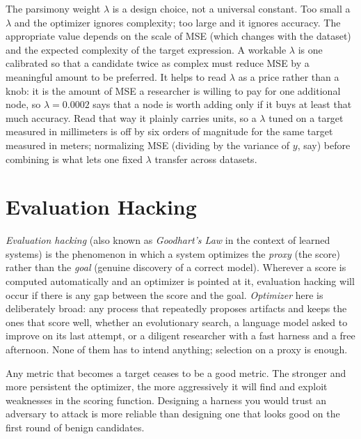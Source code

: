 \begin{remark}
The parsimony weight $\lambda$ is a design choice, not a universal constant.
Too small a $\lambda$ and the optimizer ignores complexity; too large and it ignores accuracy.
The appropriate value depends on the scale of MSE (which changes with the dataset) and the expected complexity of the target expression.
A workable $\lambda$ is one calibrated so that a candidate twice as complex must reduce MSE by a meaningful amount to be preferred.
It helps to read $\lambda$ as a price rather than a knob: it is the amount of MSE a researcher is willing to pay for one additional node, so $\lambda = 0.0002$ says that a node is worth adding only if it buys at least that much accuracy.
Read that way it plainly carries units, so a $\lambda$ tuned on a target measured in millimeters is off by six orders of magnitude for the same target measured in meters; normalizing MSE (dividing by the variance of $y$, say) before combining is what lets one fixed $\lambda$ transfer across datasets.
\end{remark}

\section{Evaluation Hacking}
\label{section:EvalHacking}

\emph{Evaluation hacking} (also known as \emph{Goodhart's Law} in the context of learned systems) is the phenomenon in which a system optimizes the \emph{proxy} (the score) rather than the \emph{goal} (genuine discovery of a correct model).
Wherever a score is computed automatically and an optimizer is pointed at it, evaluation hacking will occur if there is any gap between the score and the goal.
\emph{Optimizer} here is deliberately broad: any process that repeatedly proposes artifacts and keeps the ones that score well, whether an evolutionary search, a language model asked to improve on its last attempt, or a diligent researcher with a fast harness and a free afternoon.
None of them has to intend anything; selection on a proxy is enough.

\begin{principle}
\label{principle:GoodhartsLaw}
Any metric that becomes a target ceases to be a good metric.
The stronger and more persistent the optimizer, the more aggressively it will find and exploit weaknesses in the scoring function.
Designing a harness you would trust an adversary to attack is more reliable than designing one that looks good on the first round of benign candidates.
\end{principle}

